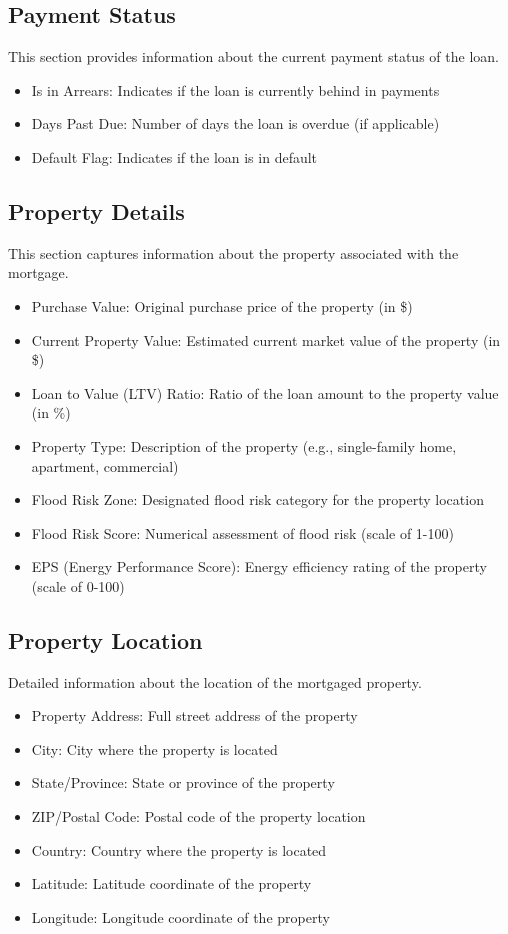 \documentclass[12pt,a4paper]{article}
\begin{document}
\subsection{Payment Status}
This section provides information about the current payment status of the loan.

\begin{itemize}
  \item Is in Arrears: Indicates if the loan is currently behind in payments
  \item Days Past Due: Number of days the loan is overdue (if applicable)
  \item Default Flag: Indicates if the loan is in default
\end{itemize}

\subsection{Property Details}
This section captures information about the property associated with the mortgage.

\begin{itemize}
  \item Purchase Value: Original purchase price of the property (in \$)
  \item Current Property Value: Estimated current market value of the property (in \$)
  \item Loan to Value (LTV) Ratio: Ratio of the loan amount to the property value (in \%)
  \item Property Type: Description of the property (e.g., single-family home, apartment, commercial)
  \item Flood Risk Zone: Designated flood risk category for the property location
  \item Flood Risk Score: Numerical assessment of flood risk (scale of 1-100)
  \item EPS (Energy Performance Score): Energy efficiency rating of the property (scale of 0-100)
\end{itemize}

\subsection{Property Location}
Detailed information about the location of the mortgaged property.

\begin{itemize}
  \item Property Address: Full street address of the property
  \item City: City where the property is located
  \item State/Province: State or province of the property
  \item ZIP/Postal Code: Postal code of the property location
  \item Country: Country where the property is located
  \item Latitude: Latitude coordinate of the property
  \item Longitude: Longitude coordinate of the property
\end{itemize}
\end{document}
